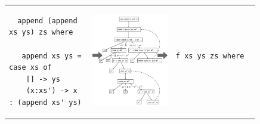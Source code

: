           

\begin{figure}[t]
\begin{tabular}{@{}m{0.33\linewidth}m{0.33\linewidth}m{0.33\linewidth}}
 \begin{minipage}[t]{0.33\textwidth}
 \begin{verbatim}
  append (append xs ys) zs where
  
   append xs ys = case xs of
    [] -> ys
    (x:xs') -> x : (append xs' ys)
  \end{verbatim}
\end{minipage}&
\begin{minipage}[t]{0.33\textwidth}
    {\includegraphics[width=1\linewidth]{figures/test.drawio.pdf}}
\end{minipage}
&
\begin{minipage}[t]{0.33\textwidth}
\begin{verbatim}
f xs ys zs where


\end{verbatim}
\end{minipage}
\end{tabular}
\end{figure}
